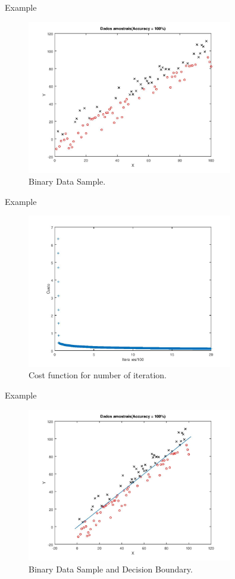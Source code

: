 \documentclass{beamer}
\begin{document}
\begin{frame}{Example}
\begin{figure}
\centering
\includegraphics[width= 0.8\textwidth]{Amostra.jpg}
\caption{Binary Data Sample. }
\end{figure}
\end{frame}

\begin{frame}{Example}
\begin{figure}
\centering
\includegraphics[width=0.8\textwidth]{Custo.jpg}
\caption{Cost function for number of iteration.}  
\end{figure}
\end{frame}

\begin{frame}{Example}
\begin{figure}
\centering
\includegraphics[width=0.8\textwidth]{General.jpg}
\caption{Binary Data Sample and Decision Boundary.}
\end{figure}
\end{frame}
\end{document}
